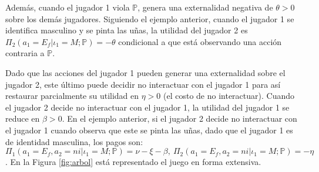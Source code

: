 Además, cuando el jugador 1 viola $\mathbb{P}$, genera una externalidad negativa de $\theta>0$ sobre los demás jugadores. Siguiendo el ejemplo anterior, cuando el jugador 1 se identifica masculino y se pinta las uñas, la utilidad del jugador 2 es $\Pi_2(a_1=E_f|\iota_1=M; \mathbb{P})=-\theta$ condicional a que está observando una acción contraria a $\mathbb{P}$.

Dado que las acciones del jugador 1 pueden generar una externalidad sobre el jugador 2, este último puede decidir no interactuar con el jugador 1 para así restaurar parcialmente su utilidad en $\eta>0$ (el costo de no interactuar). Cuando el jugador 2 decide no interactuar con el jugador 1, la utilidad del jugador 1 se reduce en $\beta>0$. En el ejemplo anterior, si el jugador 2 decide no interactuar con el jugador 1 cuando observa que este se pinta las uñas, dado que el jugador 1 es de identidad masculina, los pagos son: $\Pi_1(a_1=E_f, a_2=ni|\iota_1=M; \mathbb{P})=\nu-\xi-\beta,\ \Pi _2(a_1=E_f, a_2=ni|\iota_1=M; \mathbb{P})=-\eta$. En la Figura \ref{fig:arbol} está representado el juego en forma extensiva. 
